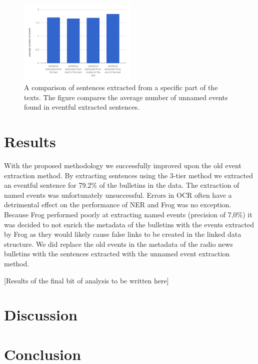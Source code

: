 \documentclass[a4paper, 10pt, conference]{ieeeconf}      %
\begin{document}
\begin{figure}
  \centering
  \includegraphics[width= 0.5\textwidth]{averageNrOfEventsDist2}
  \caption{A comparison of sentences extracted from a specific part of the texts. The figure compares the average number of unnamed events found in eventful extracted sentences.}
  \label{sentence dist extraction2}
\end{figure}


\section{Results}
With the proposed methodology we successfully improved upon the old event extraction method. By extracting sentences using the 3-tier method we extracted an eventful sentence for 79.2\% of the bulletins in the data. The extraction of named events was unfortunately unsuccessful. Errors in OCR often have a detrimental effect on the performance of NER\cite{alex2014estimating} and Frog was no exception. Because Frog performed poorly at extracting named events (precision of 7,0\%) it was decided to not enrich the metadata of the bulletins with the events extracted by Frog as they would likely cause false links to be created in the linked data structure. We did replace the old events in the metadata of the radio news bulletins with the sentences extracted with the unnamed event extraction method.

[Results of the final bit of analysis to be written here]

\section{Discussion}


\section{Conclusion}
\end{document}
